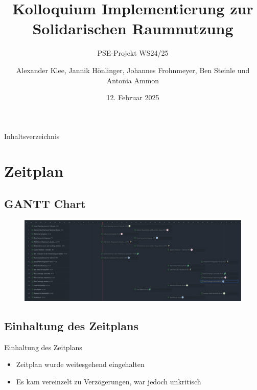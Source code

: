 \documentclass{sdqbeamer}
\title[Solidarische Raumnutzung Implementierung]{Kolloquium Implementierung zur Solidarischen Raumnutzung}
\subtitle{PSE-Projekt WS24/25}
\author[]{Alexander Klee, Jannik Hönlinger, Johannes Frohnmeyer, Ben Steinle und Antonia Ammon}
\date[12.\,2.\,2025]{12. Februar 2025}
\begin{document}
     
    \KITtitleframe
    
    \begin{frame}{Inhaltsverzeichnis}
    \tableofcontents
    \end{frame}
    
    \section{Zeitplan}
    
    \subsection{GANTT Chart}
    \begin{frame}{\insertsubsectionhead}
        \begin{figure}
            \centering
            \includegraphics[width=1\linewidth]{tasks.png}
            \label{fig:enter-label}
        \end{figure}
    \end{frame}
    \subsection{Einhaltung des Zeitplans}
    \begin{frame}{Einhaltung des Zeitplans}
        \begin{itemize}
            \item Zeitplan wurde weitesgehend eingehalten
            \item Es kam vereinzelt zu Verzögerungen, war jedoch unkritisch
        \end{itemize}
    \end{frame}
    
    
\end{document}
